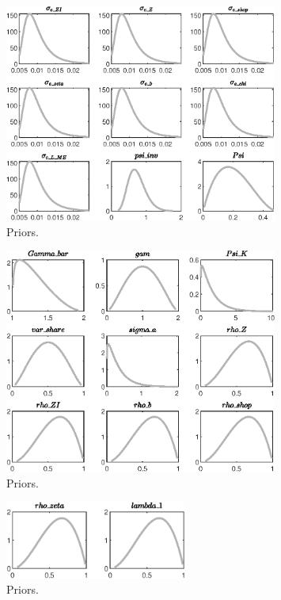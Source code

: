  
\begin{figure}[H]
\centering
\includegraphics[width=0.80\textwidth]{directed_search/graphs/directed_search_Priors1}
\caption{Priors.}\label{Fig:Priors:1}
\end{figure}
\begin{figure}[H]
\centering
\includegraphics[width=0.80\textwidth]{directed_search/graphs/directed_search_Priors2}
\caption{Priors.}\label{Fig:Priors:2}
\end{figure}
\begin{figure}[H]
\centering
\includegraphics[width=0.53\textwidth]{directed_search/graphs/directed_search_Priors3}
\caption{Priors.}\label{Fig:Priors:3}
\end{figure}
 
